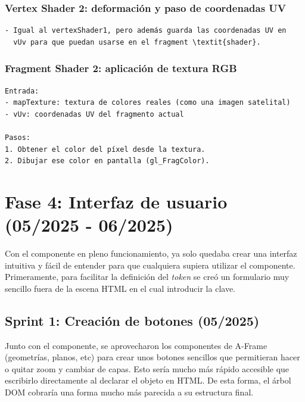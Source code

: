 \documentclass[a4paper, 12pt]{book}
\begin{document}
\subsubsection*{Vertex Shader 2: deformación y paso de coordenadas UV}

\begin{verbatim}
- Igual al vertexShader1, pero además guarda las coordenadas UV en 
  vUv para que puedan usarse en el fragment \textit{shader}.
\end{verbatim}

\subsubsection*{Fragment Shader 2: aplicación de textura RGB}

\begin{verbatim}
Entrada:
- mapTexture: textura de colores reales (como una imagen satelital)
- vUv: coordenadas UV del fragmento actual

Pasos:
1. Obtener el color del píxel desde la textura.
2. Dibujar ese color en pantalla (gl_FragColor).
\end{verbatim}

\section{Fase 4: Interfaz de usuario (05/2025 - 06/2025)} 
\label{subsec:ui-f4}

Con el componente en pleno funcionamiento, ya solo quedaba crear una interfaz intuitiva y fácil de entender para que cualquiera supiera utilizar el componente. Primeramente, para facilitar la definición del \textit{token} se creó un formulario muy sencillo fuera de la escena HTML en el cual introducir la clave.

\subsection{Sprint 1: Creación de botones (05/2025)}
\label{subsec:botones-f4-s1}

Junto con el componente, se aprovecharon los componentes de A-Frame (geometrías, planos, etc) para crear unos botones sencillos que permitieran hacer o quitar zoom y cambiar de capas. Esto sería mucho más rápido accesible que escribirlo directamente al declarar el objeto en HTML. De esta forma, el árbol DOM cobraría una forma mucho más parecida a su estructura final.
\end{document}
